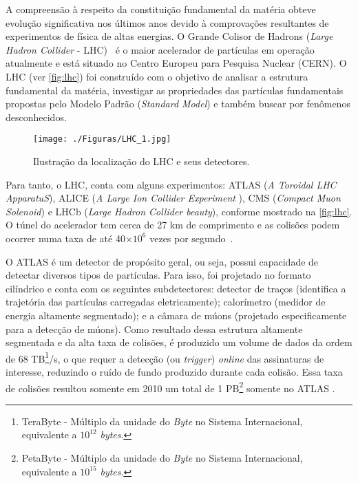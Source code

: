 
%

A compreensão à respeito da constituição fundamental da matéria obteve evolução significativa nos últimos anos devido à comprovações resultantes de experimentos de física de altas energias. O Grande Colisor de Hadrons (\emph{Large Hadron Collider } - LHC)~\cite{evans2008} é o maior acelerador de partículas em operação atualmente e está situado no Centro Europeu para Pesquisa Nuclear (CERN)\cite{cern2016}. O LHC (ver \autoref{fig:lhc}) foi construído com o objetivo de analisar a estrutura fundamental da matéria, investigar as propriedades das partículas fundamentais propostas pelo Modelo Padrão (\emph{Standard Model})\cite{moreira2009, pimenta2013} e também buscar por fenômenos desconhecidos.

\begin{figure}[H]
   \begin{center}         
      \caption{Ilustração da localização do LHC e seus detectores.}
      \texttt{[image: ./Figuras/LHC\_1.jpg]}
      \label{fig:lhc}
    \end{center}
\end{figure}



Para tanto, o LHC, conta com alguns experimentos: ATLAS (\emph{A Toroidal LHC ApparatuS}), ALICE (\emph{A Large Ion Collider Experiment }), CMS (\emph{Compact Muon Solenoid}) e LHCb (\emph{Large Hadron Collider beauty}), conforme mostrado na \autoref{fig:lhc}. O túnel do acelerador tem  cerca de 27 km de comprimento e as colisões podem ocorrer numa taxa de até 40$\times 10^6$ vezes por segundo~\cite{evans2008}.

O ATLAS é um detector de propósito geral, ou seja, possui capacidade de detectar diversos tipos de partículas. Para isso, foi projetado no formato cilíndrico e conta com os seguintes subdetectores: detector de traços (identifica a trajetória das partículas carregadas eletricamente); calorímetro (medidor de energia altamente segmentado); e a câmara de múons (projetado especificamente para a detecção de múons). Como resultado dessa estrutura altamente segmentada e da alta taxa de colisões, é produzido um volume de dados da ordem de 68 TB\footnote{TeraByte - Múltiplo da unidade do \textit{Byte} no Sistema Internacional, equivalente a $10^{12}$ \textit{bytes}.}/s, o que requer a detecção (ou \emph{trigger}) \emph{online} das assinaturas de interesse, reduzindo o ruído de fundo produzido durante cada colisão. Essa taxa de colisões resultou somente em 2010 um total de 1 PB\footnote{PetaByte - Múltiplo da unidade do \textit{Byte} no Sistema Internacional, equivalente a $10^{15}$ \textit{bytes}.} somente no ATLAS \cite{tcc:werner2011}.

